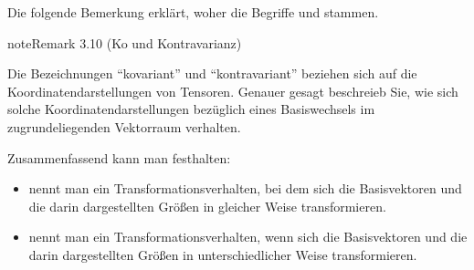 \documentclass[letterpaper,10pt,english]{jupyterBook}
\begin{document}
\sphinxAtStartPar
Die folgende Bemerkung erklärt, woher die Begriffe  und  stammen.
\label{vektoranalysis/tensor:remark-20}
\begin{sphinxadmonition}{note}{Remark 3.10 (Ko\sphinxhyphen{} und Kontravarianz)}



\sphinxAtStartPar
Die Bezeichnungen “kovariant” und “kontravariant” beziehen sich auf die Koordinatendarstellungen von Tensoren.
Genauer gesagt beschreieb Sie, wie sich solche Koordinatendarstellungen bezüglich eines Basiswechsels im zugrundeliegenden Vektorraum verhalten.

\sphinxAtStartPar
Zusammenfassend kann man festhalten:
\begin{itemize}
\item {} 
\sphinxAtStartPar
{} nennt man ein Transformationsverhalten, bei dem sich die Basisvektoren und die darin dargestellten Größen in gleicher Weise transformieren.

\item {} 
\sphinxAtStartPar
{} nennt man ein Transformationsverhalten, wenn sich die Basisvektoren und die darin dargestellten Größen in unterschiedlicher Weise transformieren.

\end{itemize}
\end{sphinxadmonition}
\end{document}
